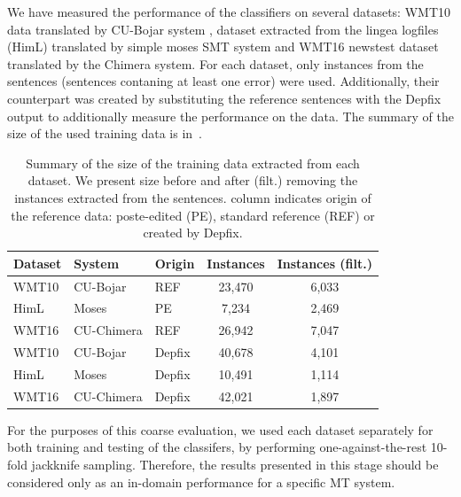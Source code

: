 We have measured the performance of the classifiers on several datasets:
WMT10 data translated by CU-Bojar system \citep{biblio:BoJaProbesin2012},
dataset extracted from the lingea logfiles (HimL) translated by simple moses SMT system \citep{Koehn:2007:MOS:1557769.1557821} and
WMT16 newstest dataset translated by the Chimera system.
For each dataset, only instances from the  sentences (sentences contaning at least one error)
were used.
Additionally, their counterpart was
created by substituting the reference sentences with the Depfix output
to additionally measure the performance on the  data.
The summary of the size of the used training data is in~.

\begin{table}[t]
\centering
\small

\begin{tabular}{lll|cc}
Dataset  &  System  & Origin  &  \hash{} Instances  &  \hash{} Instances (filt.)  \\
\hline
WMT10  &  CU-Bojar  &  REF  &  23,470  &  6,033  \\
HimL  &  Moses  &  PE  & 7,234  &  2,469  \\
WMT16  &  CU-Chimera  &  REF  &  26,942  &  7,047  \\
WMT10  &  CU-Bojar  &  Depfix  &  40,678  &  4,101  \\
HimL  &  Moses  &  Depfix  &  10,491  &  1,114  \\
WMT16  &  CU-Chimera  &  Depfix  &  42,021  &  1,897  \\
\end{tabular}
\caption{
    Summary of the size of the training data extracted from each dataset. We present
size before and after (filt.) removing the instances extracted from the  sentences.
 column indicates origin
of the reference data: poste-edited (PE), standard reference (REF) or created by Depfix.
}
\label{wf-training-sum}
\end{table}


For the purposes of this coarse evaluation, we used each dataset separately for both training
and testing of the classifers, by performing one-against-the-rest 10-fold jackknife sampling.
Therefore, the results presented in this stage should be considered only as an in-domain
performance for a specific MT system.

